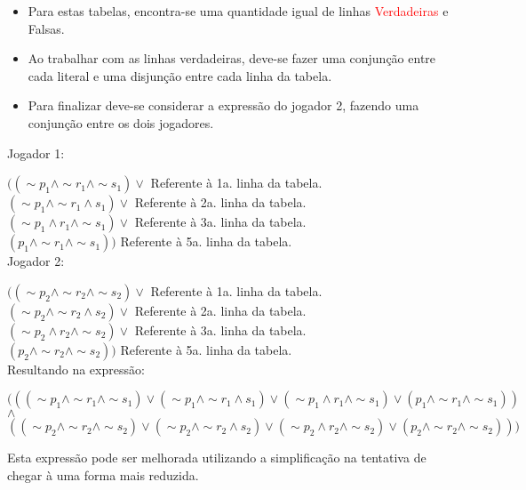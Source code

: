 \documentclass[a4paper,12pt]{article}
\begin{document}
\begin{enumerate}
\begin{enumerate}
\begin{itemize}
   \item Para estas tabelas, encontra-se uma quantidade igual de linhas \textcolor{red}{Verdadeiras} e Falsas.
   \item Ao trabalhar com as linhas verdadeiras, deve-se fazer uma conjunção entre cada literal e uma disjunção entre cada linha da tabela.
   \item Para finalizar deve-se considerar a expressão do jogador 2, fazendo uma conjunção entre os dois jogadores.
\end{itemize}

 Jogador 1:

  $((\sim p_1 \wedge \sim r_1 \wedge \sim s_1) \vee$ Referente à 1a. linha da tabela. \\ 
  $ (\sim p_1 \wedge \sim r_1 \wedge s_1 ) \vee $ Referente à 2a. linha da tabela.\\
  $(\sim p_1 \wedge  r_1 \wedge \sim s_1 ) \vee $ Referente à 3a. linha da tabela. \\
  $ (p_1 \wedge \sim r_1 \wedge \sim s_1))$ Referente à 5a. linha da tabela.  \\

 Jogador 2:
  
  $((\sim p_2 \wedge \sim r_2 \wedge \sim s_2) \vee$ Referente à 1a. linha da tabela. \\ 
  $ (\sim p_2 \wedge \sim r_2 \wedge s_2 ) \vee $ Referente à 2a. linha da tabela.\\
  $(\sim p_2 \wedge  r_2 \wedge \sim s_2 ) \vee $ Referente à 3a. linha da tabela. \\
  $ (p_2 \wedge \sim r_2 \wedge \sim s_2))$ Referente à 5a. linha da tabela.  \\
  
  Resultando na expressão:
  \begin{center}

  $(((\sim p_1 \wedge \sim r_1 \wedge \sim s_1) \vee (\sim p_1 \wedge \sim r_1 \wedge s_1 ) \vee (\sim p_1 \wedge  r_1 \wedge \sim s_1 ) \vee (p_1 \wedge \sim r_1 \wedge \sim s_1))$ \\
  $\wedge$\\
  $((\sim p_2 \wedge \sim r_2 \wedge \sim s_2) \vee (\sim p_2 \wedge \sim r_2 \wedge s_2 ) \vee (\sim p_2 \wedge  r_2 \wedge \sim s_2 ) \vee (p_2 \wedge \sim r_2 \wedge \sim s_2)))$\\
  \end{center}
  Esta expressão pode ser melhorada utilizando a simplificação na tentativa de chegar à uma forma mais reduzida.
 

\end{enumerate}
\end{enumerate}
\end{document}
